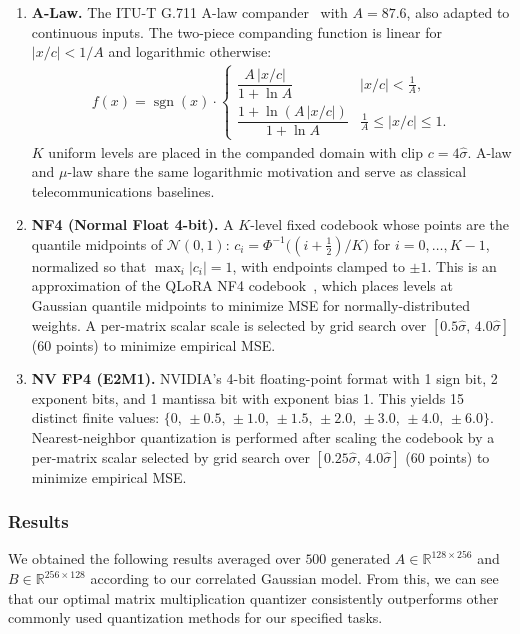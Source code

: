\documentclass{article}
\newcommand{\R}{\mathbb{R}}
\begin{document}
\begin{enumerate}
    \item \textbf{A-Law.}
    The ITU-T G.711 A-law compander~ \cite{jayant1984digital} with $A = 87.6$,
    also adapted to continuous inputs.
    The two-piece companding function is linear for $|x/c| < 1/A$ and
    logarithmic otherwise:
    \begin{align*}
    f(x) = \operatorname{sgn}(x) \cdot
    \begin{cases}
    \dfrac{A\,|x/c|}{1+\ln A} & |x/c| < \tfrac{1}{A},\\[6pt]
    \dfrac{1+\ln(A\,|x/c|)}{1+\ln A} & \tfrac{1}{A} \le |x/c| \le 1.
    \end{cases}
    \end{align*}
    $K$ uniform levels are placed in the companded domain with clip $c=4\hat\sigma$.
    A-law and $\mu$-law share the same logarithmic motivation and serve as
    classical telecommunications baselines.
    \item \textbf{NF4 (Normal Float 4-bit).}
    A $K$-level fixed codebook whose points are the quantile midpoints of
    $\mathcal{N}(0,1)$: $c_i = \Phi^{-1}\!\bigl((i+\tfrac{1}{2})/K\bigr)$
    for $i=0,\ldots,K-1$, normalized so that $\max_i|c_i|=1$, with endpoints
    clamped to $\pm 1$.
    This is an approximation of the QLoRA NF4 codebook~\cite{dettmers2023qlora},
    which places levels at Gaussian quantile midpoints to minimize MSE for
    normally-distributed weights.
    A per-matrix scalar scale is selected by grid search over
    $[0.5\hat\sigma,\,4.0\hat\sigma]$ (60 points) to minimize empirical MSE.
    \item \textbf{NV FP4 (E2M1).}
    NVIDIA's 4-bit floating-point format \cite{nvidia2025nvfp4} with
    1 sign bit, 2 exponent bits, and 1 mantissa bit with exponent bias 1.
    This yields 15 distinct finite values:
    $\{0,\,\pm 0.5,\,\pm 1.0,\,\pm 1.5,\,\pm 2.0,\,\pm 3.0,\,\pm 4.0,\,\pm 6.0\}$.
    Nearest-neighbor quantization is performed after scaling the codebook by a
    per-matrix scalar selected by grid search over
    $[0.25\hat\sigma,\,4.0\hat\sigma]$ (60 points) to minimize empirical MSE.
\end{enumerate}

\subsubsection{Results}

We obtained the following results averaged over $500$ generated $A \in \R^{128 \times 256}$ and $B \in \R^{256 \times 128}$ according to our correlated Gaussian model. From this, we can see that our optimal matrix multiplication quantizer consistently outperforms other commonly used quantization methods for our specified tasks.
\end{document}
